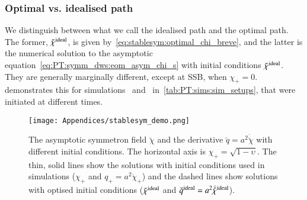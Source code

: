 \subsubsection{Optimal vs. idealised path}
    We distinguish between what we call the idealised path and the optimal path. The former, $\breve{\chi}^\mathrm{ideal}$, is given by~\cref{eq:stablesym:optimal_chi_breve}, and the latter is the numerical solution to the asymptotic equation~\cref{eq:PT:symm_dws:eom_asym_chi_s} with initial conditions $\breve{\chi}^\mathrm{ideal}$. They are generally marginally different, except at SSB, when $\chi_+ = 0$.  demonstrates this for simulations~ and~ in~\cref{tab:PT:sims:sim_setups}, that were initiated at different times.
    \begin{figure}[h!]
        \centering
        \texttt{[image: Appendices/stablesym\_demo.png]}
        \caption{The asymptotic symmetron field $\breve{\chi}$ and the derivative $\breve{q}=a^2\dot{\breve{\chi}}$ with different initial conditions. The horizontal axis is $\chi_+=\sqrt{1-\upsilon}$. The thin, solid lines show the solutions with initial conditions used in simulations ($\chi_+$ and $q_+= a^2 \dot{\chi}_+$) and the dashed lines show solutions with optised initial conditions ($\breve{\chi}^\mathrm{ideal}$ and $\breve{q}^\mathrm{ideal} =a^2 \dot{\breve{\chi}}^\mathrm{ideal}$).}
        \label{fig:stablesym:computation:stablesym_demo}
    \end{figure}%

